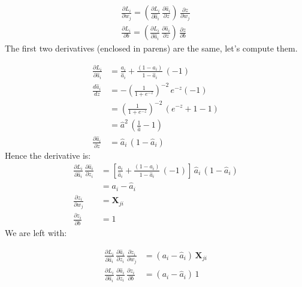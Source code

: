 \begin{align}
  \frac{\partial L_i}{\partial w_j} = 
  \left(\frac{\partial L_i}{\partial \hat{a}_i}\, \frac{\partial \hat{a}_i}{\partial z}\right)\,\frac{\partial z}{\partial w_j}\\
  \frac{\partial L_i}{\partial b} = 
  \left(\frac{\partial L_i}{\partial \hat{a}_i}\,\frac{\partial \hat{a}_i}{\partial z}\right)\,\frac{\partial z}{\partial b}
\end{align}
The first two derivatives (enclosed in parens) are the same, let's compute them.

\begin{align*}
  \frac{\partial L_i}{\partial \hat{a}_i} &= \frac{a_i}{\hat{a}_i} + \frac{(1-a_i)}{1-\hat{a}_i}\,(-1) \\
  \frac{d\hat{a}_i}{dz}&=-\left(\frac{1}{1+e^{-z}}\right)^{-2}\,e^{-z}(-1)\\
  &=\left(\frac{1}{1+e^{-z}}\right)^{-2}\,(e^{-z} + 1 -1)\\
  &= \hat{a}^2\,(\frac{1}{\hat{a}} -1) \\
  \frac{\partial \hat{a}_i}{\partial z} &= \hat{a}_i\,(1-\hat{a}_i)
\end{align*}
Hence the derivative is:
\begin{align*}
  \frac{\partial L_i}{\partial \hat{a}_i}\,\frac{\partial \hat{a}_i}{\partial z_i} &= \left[ \frac{a_i}{\hat{a}_i} + \frac{(1-a_i)}{1-\hat{a}_i}\,(-1) \right]\,\hat{a}_i\,(1-\hat{a}_i)\\
  &= a_i - \hat{a}_i\\
  \frac{\partial z_i}{\partial w_j} &= \mathbf{X}_{ji}\\
  \frac{\partial z_i}{\partial b} &= 1
\end{align*}
We are left with:

\begin{align*}
  \frac{\partial L_i}{\partial \hat{a}_i}\,\frac{\partial \hat{a}_i}{\partial z_i}\,\frac{\partial z_i}{\partial w_j} &= \left(a_i - \hat{a}_i\right)\,\mathbf{X}_{ji}\\
  \frac{\partial L_i}{\partial \hat{a}_i}\,\frac{\partial \hat{a}_i}{\partial z_i}\,\frac{\partial z_i}{\partial b} &= \left(a_i - \hat{a}_i\right)\,1\\
\end{align*}


